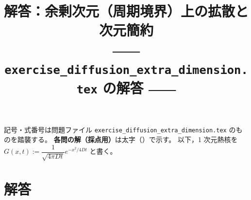 \documentclass[dvipdfmx, uplatex]{jsarticle}
\title{解答：余剰次元（周期境界）上の拡散と次元簡約\\
\large ―― \texttt{exercise\_diffusion\_extra\_dimension.tex} の解答 ――}
\author{}
\date{}
\theoremstyle{definition}
\begin{document}
\maketitle
\vspace{-6zh}

記号・式番号は問題ファイル \texttt{exercise\_diffusion\_extra\_dimension.tex} のものを踏襲する。
\textbf{各問の解（採点用）}は太字（\boxed）で示す。
以下，1 次元熱核を $G(x,t):=\dfrac{1}{\sqrt{4\pi Dt}}e^{-x^2/4Dt}$ と書く。

\section{解答}
\end{document}
